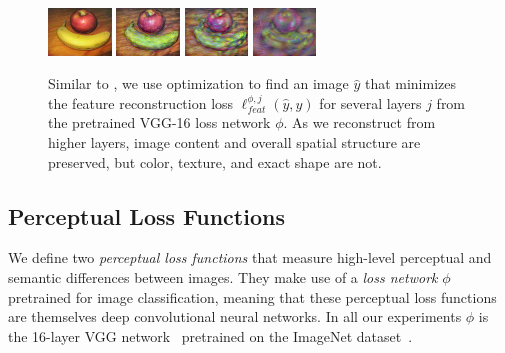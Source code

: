 \documentclass[runningheads]{llncs}
\begin{document}
\begin{figure}[t]
\begin{center}
    \includegraphics[width=0.15\textwidth]{fruit_16.jpg}
    \includegraphics[width=0.15\textwidth]{fruit_23.jpg}
    \includegraphics[width=0.15\textwidth]{fruit_26.jpg}
    \includegraphics[width=0.15\textwidth]{fruit_30.jpg}
  \end{center}
  \vspace{-5mm}
  \caption{Similar to \cite{mahendran15understanding}, we use optimization to find an image
    $\hat y$ that minimizes the feature reconstruction loss
    $\ell_{feat}^{\phi, j}(\hat y, y)$ for several layers $j$ from the pretrained VGG-16
    loss network $\phi$. As we reconstruct from higher layers, image content and overall
    spatial structure are preserved, but color, texture, and exact shape are not.
  }
  \label{fig:feature-loss}
\end{figure}


\subsection{Perceptual Loss Functions}
We define two \emph{perceptual loss functions} that measure high-level perceptual and semantic
differences between images. They make use of a \emph{loss network} $\phi$ pretrained
for image classification, meaning that these perceptual loss functions
are themselves deep convolutional neural networks. In all our experiments $\phi$ is the 
16-layer VGG network~\cite{simonyan2014very} pretrained on the ImageNet dataset~\cite{ILSVRC15}.
\end{document}
